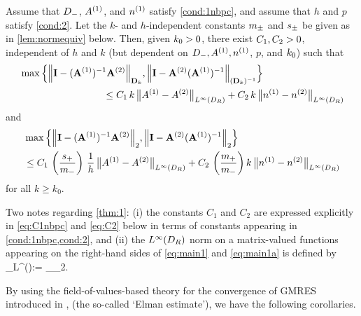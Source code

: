 \begin{theorem}\label{thm:1}
Assume that $D_{-}$, ${A}^{(1)}$, and ${n}^{(1)}$ satisfy \cref{cond:1nbpc}, and assume that $h$ and $p$ satisfy \cref{cond:2}. 
Let the $k$- and $h$-independent constants $m_{\pm}$ and $s_{\pm}$ be given as in \cref{lem:normequiv} below.
Then, given $k_{0}>0$, there exist $C_{1}, C_{2}>0$, independent of $h$ and $k$ (but dependent on $D_{-}, {A}^{(1)}, {n}^{(1)}$, $p$, and $k_{0}$) such that
\begin{align}\nonumber
&\max\Big\{
\NDmatk{\Imat - (\Amat^{(1)})^{-1}\Amat^{(2)}}, 
\N{\Imat -\Amat^{(2)} (\Amat^{(1)})^{-1}}_{(\Dmat_k)^{-1}}
\Big\}\\
&\hspace{3cm} 
\leq C_1 \,k \,
\big\|\Aso-\Ast\big\|_{L^\infty(\DR)} + C_2 \, k \, \big\|\nso-\nst\big\|_{L^\infty(\DR)}
\label{eq:main1}
\end{align}
and 
\begin{align}\nonumber
&\max\Big\{
\N{\Imat - (\Amat^{(1)})^{-1}\Amat^{(2)}}_2, 
\N{\Imat -\Amat^{(2)} (\Amat^{(1)})^{-1}}_2
\Big\}\\
&\hspace{0cm} 
\leq C_1 \,\left(\frac{s_+}{m_-}\right) \,\frac{1}{h} \,
\big\|\Aso-\Ast\big\|_{L^\infty(\DR)} + C_2 \, \left(\frac{m_+}{m_-} \right)k \, \big\|\nso-\nst\big\|_{L^\infty(\DR)}
\label{eq:main1a}
\end{align}
for all $k\geq k_0$. 
\end{theorem}

Two notes regarding \cref{thm:1}: (i) the constants $C_1$ and $C_2$ are expressed explicitly in \cref{eq:C1nbpc} and \cref{eq:C2} below in terms of constants appearing in \cref{cond:1nbpc,cond:2}, and (ii) the $L^\infty(D_{R})$ norm on a matrix-valued functions appearing on the right-hand sides of \cref{eq:main1} and \cref{eq:main1a} is defined by
\beqs
{}_{L^\infty(\DR)}:= \esssup_{\bx\in\DR}_2.
\eeqs

By using the field-of-values-based theory for the convergence of GMRES introduced in \cite{El:82}, \cite{EiElSc:83} (the so-called `Elman estimate'), we have the following corollaries.

